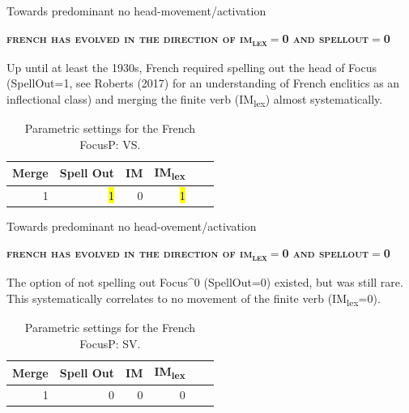 \documentclass[lesson_slides]{subfiles}
\begin{document}
\begin{frame}[c]{Towards predominant no head-movement/activation}

    \textbf{\textsc{french has evolved in the direction of im\textsubscript{lex}$=$0 and spellout$=$0}}

    \noindent Up until at least the 1930s, French required spelling out the head of Focus (SpellOut=1, see Roberts (2017) for an understanding of French enclitics as an inflectional class) and merging the finite verb (IM\textsubscript{lex}) almost systematically.

    \begin{table}[H]
        \centering
        \begin{tabular}{|r|r|r|r|r|r|}
        \hline
        Merge & Spell Out & IM  & IM\textsubscript{lex} \\
        \hline
        1 & \hl{1} & 0 & \hl{1} \\
        \hline
        \end{tabular}
        \caption{\label{tab:samp}Parametric settings for the French FocusP: VS.}
    \end{table}
  
\end{frame}
\begin{frame}[c]{Towards predominant no head-ovement/activation}

    \vspace*{-10mm}
    \textbf{\textsc{french has evolved in the direction of im\textsubscript{lex}$=$0 and spellout$=$0}} \pause

\noindent The option of not spelling out Focus^0 (SpellOut=0) existed, but was still rare. This systematically correlates to no movement of the finite verb (IM\textsubscript{lex}=0). \pause

\begin{table}[H]
    \centering
    \begin{tabular}{|r|r|r|r|r|r|}
    \hline
    Merge & Spell Out & IM & IM\textsubscript{lex} \\
    \hline
    1 & 0 & 0 & 0 \\
    \hline
    \end{tabular}
    \caption{\label{tab:samp}Parametric settings for the French FocusP: SV.}
\end{table}
  
\end{frame}
\end{document}
